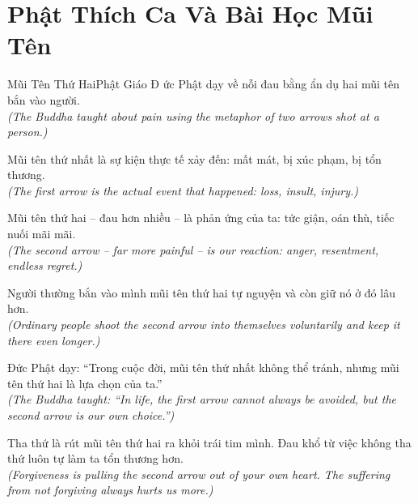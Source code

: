 \section{Phật Thích Ca Và Bài Học Mũi Tên}
\begin{truyen}{Mũi Tên Thứ Hai}{Phật Giáo}
Đ ức Phật dạy về nỗi đau bằng ẩn dụ hai mũi tên bắn vào người.\\
\textit{(The Buddha taught about pain using the metaphor of two arrows shot at a person.)}

Mũi tên thứ nhất là sự kiện thực tế xảy đến: mất mát, bị xúc phạm, bị tổn thương.\\
\textit{(The first arrow is the actual event that happened: loss, insult, injury.)}

Mũi tên thứ hai -- đau hơn nhiều -- là phản ứng của ta: tức giận, oán thù, tiếc nuối mãi mãi.\\
\textit{(The second arrow -- far more painful -- is our reaction: anger, resentment, endless regret.)}

Người thường bắn vào mình mũi tên thứ hai tự nguyện và còn giữ nó ở đó lâu hơn.\\
\textit{(Ordinary people shoot the second arrow into themselves voluntarily and keep it there even longer.)}

Đức Phật dạy: ``Trong cuộc đời, mũi tên thứ nhất không thể tránh, nhưng mũi tên thứ hai là lựa chọn của ta.''\\
\textit{(The Buddha taught: ``In life, the first arrow cannot always be avoided, but the second arrow is our own choice.'')}

\end{truyen}
\begin{baihoc}
  Tha thứ là rút mũi tên thứ hai ra khỏi trái tim mình. Đau khổ từ việc không tha thứ luôn tự làm ta tổn thương hơn.\\
  \textit{(Forgiveness is pulling the second arrow out of your own heart. The suffering from not forgiving always hurts us more.)}
\end{baihoc}


